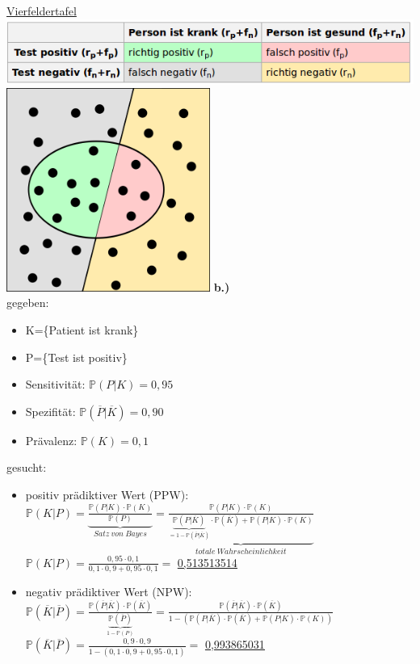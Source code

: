 \underline{Vierfeldertafel}\\
\includegraphics[width=1\textwidth]{lectures/V3/pix/Konfusionsmatrix.png}
\includegraphics[width=0.5\textwidth]{lectures/V3/pix/Binary-classification-file.png}
\newpage
\textbf{b.)}\\
gegeben:
\begin{itemize}
	\item K=\{Patient ist krank\}
	\item P=\{Test ist positiv\}
	\item Sensitivität: $\mathbb{P}(P|K)=0,95$
	\item Spezifität: $\mathbb{P}(\overline{P}|\overline{K})=0,90$
	\item Prävalenz: $\mathbb{P}(K)=0,1$
\end{itemize}

gesucht:\\
\begin{itemize}
	\item positiv prädiktiver Wert (PPW): \\
	$\mathbb{P}(K|P) = \underbrace{\frac{\mathbb{P}(P|K) \cdot \mathbb{P}(K)}{\mathbb{P}(P)}}_{Satz\ von\ Bayes} = \underbrace{\frac{\mathbb{P}(P|K) \cdot \mathbb{P}(K)}{\underbrace{\mathbb{P}(P|\overline{K})}_{=1-\mathbb{P}(\overline{P}|\overline{K})} \cdot \mathbb{P}(\overline{K}) + \mathbb{P}(P|K) \cdot \mathbb{P}(K)}}_{totale\ Wahrscheinlichkeit}$\\
	$\mathbb{P}(K|P) = \frac{0,95 \cdot 0,1}{0,1 \cdot 0,9 + 0,95 \cdot 0,1} = $ \underline{\underline{0,513513514}}
	\item negativ prädiktiver Wert (NPW):\\
	$\mathbb{P}(\overline{K}|\overline{P})= \frac{\mathbb{P}(\overline{P}|\overline{K}) \cdot \mathbb{P}(\overline{K})}{\underbrace{\mathbb{P}(\overline{P})}_{1-\mathbb{P}(P)}} = \frac{\mathbb{P}(\overline{P}|\overline{K}) \cdot \mathbb{P}(\overline{K})}{1 - (\mathbb{P}(P|\overline{K}) \cdot \mathbb{P}(\overline{K}) + \mathbb{P}(P|K) \cdot \mathbb{P}(K))}$\\
	$\mathbb{P}(\overline{K}|\overline{P})= \frac{0,9 \cdot 0,9}{1-(0,1 \cdot 0,9 + 0,95 \cdot 0,1)} =$ \underline{\underline{0,993865031}}
\end{itemize}

